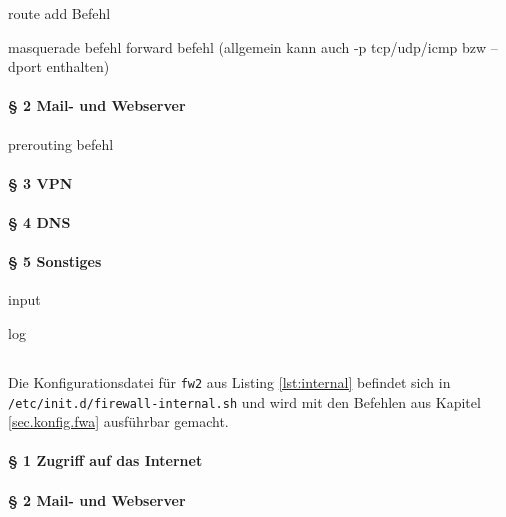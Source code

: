route add Befehl

masquerade befehl
forward befehl (allgemein kann auch -p tcp/udp/icmp bzw --dport enthalten)

\paragraph{§ 2 Mail- und Webserver}

prerouting befehl


\paragraph{§ 3 VPN}


\paragraph{§ 4 DNS}


\paragraph{§ 5 Sonstiges}

input

log

\subsection{\fwb}

Die Konfigurationsdatei für {\tt fw2} aus Listing \ref{lst:internal}
befindet sich in\\
{\tt /etc/init.d/firewall-internal.sh} und wird mit den Befehlen
aus Kapitel \ref{sec.konfig.fwa} ausführbar gemacht.

\paragraph{§ 1 Zugriff auf das Internet}



\paragraph{§ 2 Mail- und Webserver}


